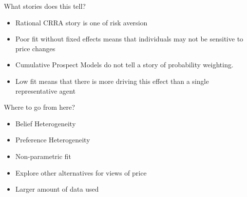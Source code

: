 \documentclass[presentation]{beamer}
\begin{document}
\begin{frame}[label={sec:orgc133c59}]{What stories does this tell?}
\begin{itemize}
\item Rational CRRA story is one of risk aversion
\item Poor fit without fixed effects means that individuals may not be
sensitive to price changes
\item Cumulative Prospect Models do not tell a story of probability
weighting.
\item Low fit means that there is more driving this effect than a single
representative agent
\end{itemize}
\end{frame}

\begin{frame}[label={sec:org8772905}]{Where to go from here?}
\begin{itemize}
\item Belief Heterogeneity
\item Preference Heterogeneity
\item Non-parametric fit
\item Explore other alternatives for views of price
\item Larger amount of data used
\end{itemize}
\end{frame}
\end{document}
